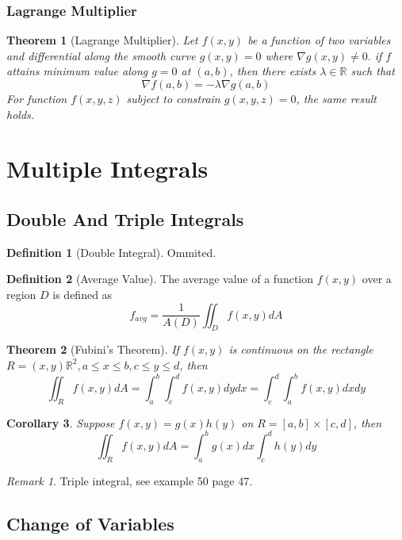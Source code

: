 \documentclass[12pt,a4paper]{article}
\newtheorem{theorem}{Theorem}[subsection]
\newtheorem{corollary}[theorem]{Corollary}
\theoremstyle{definition}
\newtheorem{definition}{Definition}[section]
\theoremstyle{remark}
\newtheorem{remark}{Remark}[section]
\begin{document}
\subsubsection{Lagrange Multiplier}

\begin{theorem}[Lagrange Multiplier]
	Let $f(x,y)$ be a function of two variables and differential along the smooth curve $g(x,y) = 0$ where $\nabla g (x,y) \neq 0.$ 
	if $f$ attains minimum value along $g = 0$ at $(a,b)$, then there exists $\lambda \in \mathbb{R}$ such that
	\[
		\nabla f (a,b)= - \lambda \nabla g(a, b)
	\]
	For function $f(x,y,z)$ subject to constrain $g(x,y,z) = 0$, the same result holds. 
\end{theorem}

\section{Multiple Integrals}
\subsection{Double And Triple Integrals}
\begin{definition}[Double Integral]
Ommited.
\end{definition}
\begin{definition}[Average Value]
	The average value of a function $f(x,y)$ over a region $D$ is defined as
	\[
		f_{avg} = \frac{1}{A(D)} \iint_D f(x,y) dA
	\]
	
\end{definition}

\begin{theorem}[Fubini's Theorem]
	If $f(x, y)$ is continuous on the rectangle $R = {(x, y) \mathbb{R}^2, a \leq x \leq b, c\leq y \leq d}$, then
\[
	\iint_R f(x,y) dA = \int_a^b \int_c^d f(x,y) dydx = \int_c^d \int_a^b f(x,y) dxdy
\]
	
\end{theorem}

\begin{corollary}
	Suppose $f(x,y) = g(x)h(y)$ on $R = [a,b] \times [c,d]$, then
\[
	\iint_R f(x,y) dA = \int_a^b g(x) dx \int_c^d h(y) dy
\]
	
\end{corollary}
\begin{remark}
	Triple integral, see example 50 page 47.
\end{remark}

\subsection{Change of Variables}
\end{document}

